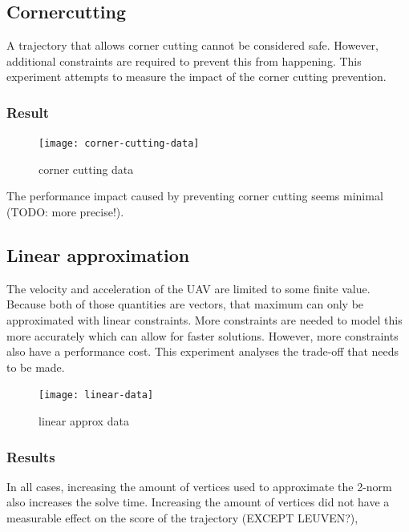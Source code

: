 \clearpage
\subsection{Cornercutting}
A trajectory that allows corner cutting cannot be considered safe. However, additional constraints are required to prevent this from happening. This experiment attempts to measure the impact of the corner cutting prevention.


\subsubsection{Result}
\begin{figure}[]
	\centering
	\texttt{[image: corner-cutting-data]}
	\caption{corner cutting data}
	\label{fig:corner-data}
\end{figure}

The performance impact caused by preventing corner cutting seems minimal (TODO: more precise!).


\clearpage
\subsection{Linear approximation}
The velocity and acceleration of the UAV are limited to some finite value. Because both of those quantities are vectors, that maximum can only be approximated with linear constraints. More constraints are needed to model this more accurately which can allow for faster solutions. However, more constraints also have a performance cost. This experiment analyses the trade-off that needs to be made.
\begin{figure}[]
	\centering
	\texttt{[image: linear-data]}
	\caption{linear approx data}
	\label{fig:linear-approx-data}
\end{figure}



\subsubsection{Results}
In all cases, increasing the amount of vertices used to approximate the 2-norm also increases the solve time. Increasing the amount of vertices did not have a measurable effect on the score of the trajectory (EXCEPT LEUVEN?), 

\clearpage
